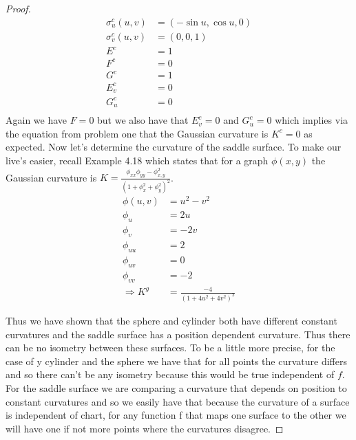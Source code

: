 \documentclass[a4paper, 11pt]{article}
\begin{document}
\begin{proof}
			\begin{align*}
				\sigma_u^c(u,v) &= (-\sin u, \cos u, 0) \\ 
				\sigma_v^c(u,v) &= (0, 0, 1) \\ 
				E^c &= 1 \\ 
				F^c &= 0 \\ 
				G^c &= 1 \\ 
				E_v^c &= 0 \\ 
				G_u^c &= 0 \\ 
			\end{align*}
		Again we have $F=0$ but we also have that $	E_v^c = 0$ and $G_u^c = 0$ which implies via the equation from problem one that the Gaussian curvature is $K^c=0$ as expected. Now let's determine the curvature of the saddle surface. To make our live's easier, recall Example 4.18 which states that for a graph $\phi(x,y)$ the Gaussian curvature is $K = \frac{\phi_{xx}\phi_{yy}-\phi^2_{x,y}}{(1+\phi_x^2+\phi_y^2)^2}$. 
			\begin{align*}
			 \phi(u,v) &= u^2 - v^2 \\ 
			 \phi_u &= 2u \\ 
			 \phi_v &= -2v \\ 
			 \phi_{uu} &= 2 \\ 
			 \phi_{uv} &= 0 \\ 
			 \phi_{vv} &= -2 \\ 
			 \Rightarrow K^g &= \frac{-4}{(1+4u^2+4v^2)^2}
			\end{align*}
	
	\noindent Thus we have shown that the sphere and cylinder both have different constant curvatures and the saddle surface has a position dependent curvature. Thus there can be no isometry between these surfaces. To be a little more precise, for the case of y cylinder and the sphere we have that for all points the curvature differs and so there can't be any isometry because this would be true independent of $f$. For the saddle surface we are comparing a curvature that depends on position to constant curvatures and so we easily have that because the curvature of a surface is independent of chart, for any function f that maps one surface to the other we will have one if not more points where the curvatures disagree. 
	\end{proof}
	

	
	
	
	
	
	
	
	
	
	
	
	
	
	
	
	
	
	
	
	
	
	
	
	
	
	
	
	
	
\end{document}
